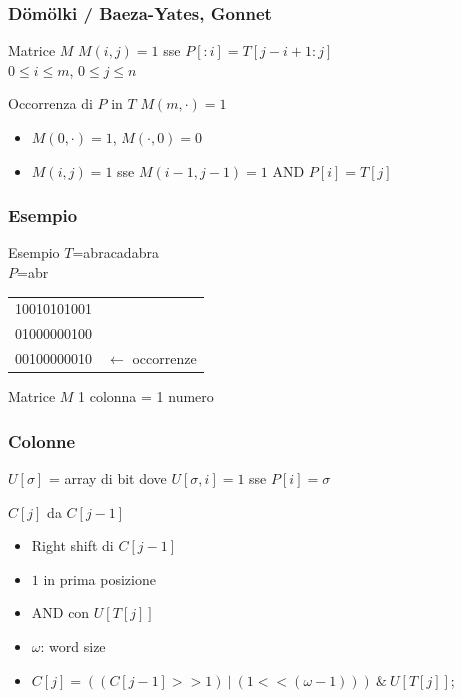 \begin{frame}
\frametitle{D\"om\"olki / Baeza-Yates, Gonnet}
\begin{block}{Matrice $M$}
$M(i,j)=1$ sse $P[:i]=T[j-i+1:j]$\\
$0\le i\le m$, $0\le j\le n$
\end{block}
\begin{block}{Occorrenza di $P$ in $T$}
$M(m,\cdot)=1$
\end{block}
\begin{itemize}
\item
$M(0,\cdot)=1$, $M(\cdot,0)=0$
\item
\alert{$M(i,j)=1$} sse $M(i-1, j-1)=1$ AND $P[i]=T[j]$
\end{itemize}
\end{frame}

\begin{frame}
\frametitle{Esempio}
\begin{block}{Esempio}
$T$=abracadabra\\
$P$=abr
\end{block}

\begin{center}
\begin{tabular}[l]{ll}
10010101001\\
01000000100\\
00100000010&$\leftarrow$ \alert{occorrenze}\\%
\end{tabular}
\end{center}

\begin{block}{Matrice $M$}
1 colonna = 1 numero
\end{block}
\end{frame}

\begin{frame}[fragile]
\frametitle{Colonne}
$U[\sigma]$ = array di bit dove $U[\sigma,i]=1$ sse $P[i]=\sigma$

\begin{block}{$C[j]$ da $C[j-1]$}
\begin{itemize}
\item
Right shift di $C[j-1]$
\item
$1$ in prima posizione
\item
AND con $U[T[j]]$
\item
\alert{$\omega$}: word size
\item
$C[j] = \left( \left(C[j-1] >> 1 \right) \  | \  \left(1 << (\omega -1) \right) \right)\ \&\  U[T[j]]$;
\end{itemize}
\end{block}
\end{frame}

